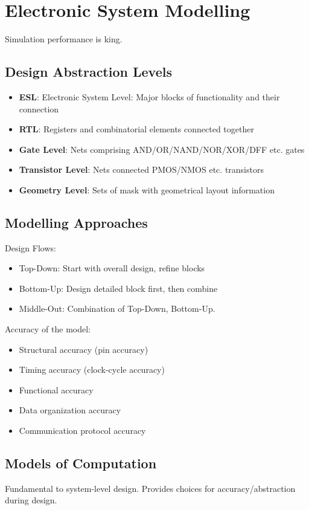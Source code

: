 \chapter{Electronic System Modelling}
Simulation performance is king.

\section{Design Abstraction Levels}
\begin{itemize}
    \item \textbf{ESL}: Electronic System Level: Major blocks of functionality and their connection
    \item \textbf{RTL}: Registers and combinatorial elements connected together
    \item \textbf{Gate Level}: Nets comprising AND/OR/NAND/NOR/XOR/DFF etc. gates
    \item \textbf{Transistor Level}: Nets connected PMOS/NMOS etc. transistors
    \item \textbf{Geometry Level}: Sets of mask with geometrical layout information
\end{itemize}

\section{Modelling Approaches}
Design Flows:
\begin{itemize}
    \item Top-Down: Start with overall design, refine blocks
    \item Bottom-Up: Design detailed block first, then combine
    \item Middle-Out: Combination of Top-Down, Bottom-Up.
\end{itemize}

Accuracy of the model:
\begin{itemize}
    \item Structural accuracy (pin accuracy)
    \item Timing accuracy (clock-cycle accuracy)
    \item Functional accuracy
    \item Data organization accuracy
    \item Communication protocol accuracy
\end{itemize}

\section{Models of Computation}
Fundamental to system-level design. Provides choices for accuracy/abstraction during design.


